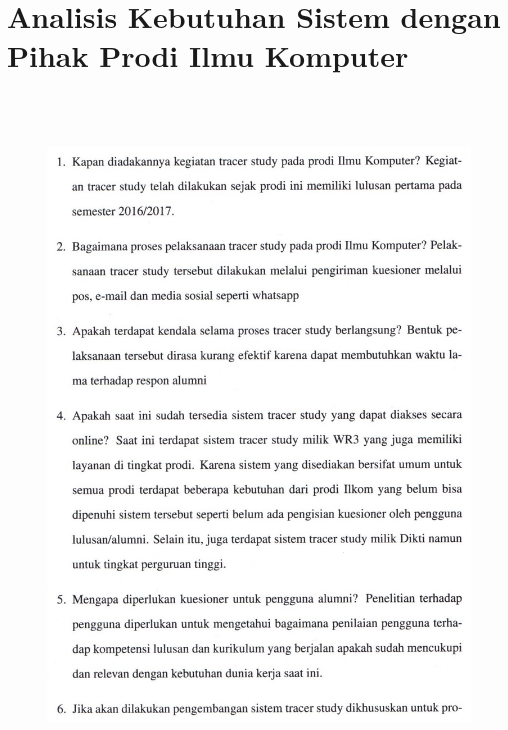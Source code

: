 \chapter{Analisis Kebutuhan Sistem dengan Pihak Prodi Ilmu Komputer}

\begin{figure}[H]
	\centering
	\includegraphics[width=14cm, height=18cm]{gambar/analisiskebutuhan1}
	\label{analisis1}
\end{figure}

